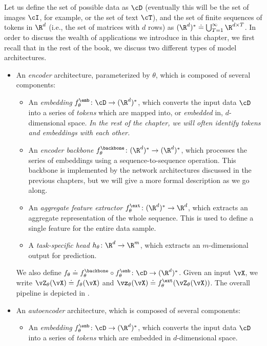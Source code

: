 \documentclass[../../book-main.tex]{subfiles}
\begin{document}
Let us define the set of possible data as \(\cD\) (eventually this will be the set of images \(\cI\), for example, or the set of text \(\cT\)), and the set of finite sequences of tokens in \(\R^{d}\) (i.e., the set of matrices with \(d\) rows) as \((\R^{d})^{*} \doteq \bigcup_{T = 1}^{\infty}\R^{d \times T}\). In order to discuss the wealth of applications we introduce in this chapter, we first recall that in the rest of the book, we discuss two different types of model architectures.
\begin{itemize}
    \item An \textit{encoder} architecture, parameterized by \(\theta\), which is composed of several components:
    \begin{itemize}
        \item An \textit{embedding} \(f_{\theta}^{\emb} \colon \cD \to (\R^{d})^{*}\), which converts the input data \(\cD\) into a series of \textit{tokens} which are mapped into, or \textit{embedded} in, \(d\)-dimensional space. \textit{In the rest of the chapter, we will often identify tokens and embeddings with each other.}
        \item An \textit{encoder backbone} \(f_{\theta}^{\backbone} \colon (\R^{d})^{*} \to (\R^{d})^{*}\), which processes the series of embeddings using a sequence-to-sequence operation. This backbone is implemented by the network architectures discussed in the previous chapters, but we will give a more formal description as we go along.
        \item An \textit{aggregate feature extractor} \(f_{\theta}^{\ext} \colon (\R^{d})^{*} \to \R^{d}\), which extracts an aggregate representation of the whole sequence. This is used to define a single feature for the entire data sample.
        \item A \textit{task-specific head} \(h_{\theta} \colon \R^{d} \to \R^{m}\), which extracts an \(m\)-dimensional output for prediction.
    \end{itemize}
    We also define \(f_{\theta} \doteq f_{\theta}^{\backbone} \circ f_{\theta}^{\emb} \colon \cD \to (\R^{d})^{*}\). Given an input \(\vX\), we write \(\vZ_{\theta}(\vX) \doteq f_{\theta}(\vX)\) and \(\vz_{\theta}(\vX) \doteq f_{\theta}^{\ext}(\vZ_{\theta}(\vX))\). The overall pipeline is depicted in .
    \item An \textit{autoencoder} architecture, which is composed of several components:
    \begin{itemize}
        \item An \textit{embedding} \(f_{\theta}^{\emb} \colon \cD \to (\R^{d})^{*}\), which converts the input data \(\cD\) into a series of \textit{tokens} which are embedded in \(d\)-dimensional space.

\end{itemize}
\end{itemize}
\end{document}

